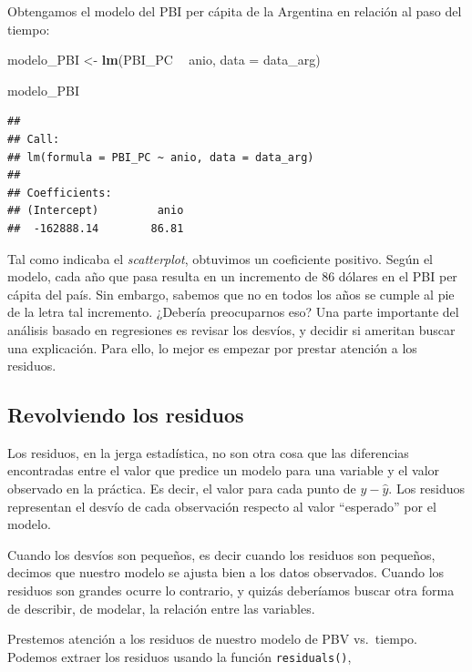 \documentclass[spanish,]{book}
\newenvironment{Shaded}{\begin{snugshade}}{\end{snugshade}}
\newcommand{\DataTypeTok}[1]{\textcolor[rgb]{0.13,0.29,0.53}{#1}}
\newcommand{\KeywordTok}[1]{\textcolor[rgb]{0.13,0.29,0.53}{\textbf{#1}}}
\newcommand{\NormalTok}[1]{#1}
\newcommand{\OperatorTok}[1]{\textcolor[rgb]{0.81,0.36,0.00}{\textbf{#1}}}
\newcommand{\StringTok}[1]{\textcolor[rgb]{0.31,0.60,0.02}{#1}}
\begin{document}
Obtengamos el modelo del PBI per cápita de la Argentina en relación al paso del tiempo:

\begin{Shaded}
\begin{Highlighting}[]
\NormalTok{modelo_PBI <-}\StringTok{ }\KeywordTok{lm}\NormalTok{(PBI_PC }\OperatorTok{~}\StringTok{ }\NormalTok{anio, }\DataTypeTok{data =}\NormalTok{ data_arg)}

\NormalTok{modelo_PBI}
\end{Highlighting}
\end{Shaded}

\begin{verbatim}
## 
## Call:
## lm(formula = PBI_PC ~ anio, data = data_arg)
## 
## Coefficients:
## (Intercept)         anio  
##  -162888.14        86.81
\end{verbatim}

Tal como indicaba el \emph{scatterplot}, obtuvimos un coeficiente positivo. Según el modelo, cada año que pasa resulta en un incremento de 86 dólares en el PBI per cápita del país. Sin embargo, sabemos que no en todos los años se cumple al pie de la letra tal incremento. ¿Debería preocuparnos eso? Una parte importante del análisis basado en regresiones es revisar los desvíos, y decidir si ameritan buscar una explicación. Para ello, lo mejor es empezar por prestar atención a los residuos.

\hypertarget{revolviendo-los-residuos}{%
\subsection{Revolviendo los residuos}\label{revolviendo-los-residuos}}

Los residuos, en la jerga estadística, no son otra cosa que las diferencias encontradas entre el valor que predice un modelo para una variable y el valor observado en la práctica. Es decir, el valor para cada punto de \(y - \widehat{y}\). Los residuos representan el desvío de cada observación respecto al valor ``esperado'' por el modelo.

Cuando los desvíos son pequeños, es decir cuando los residuos son pequeños, decimos que nuestro modelo se ajusta bien a los datos observados. Cuando los residuos son grandes ocurre lo contrario, y quizás deberíamos buscar otra forma de describir, de modelar, la relación entre las variables.

Prestemos atención a los residuos de nuestro modelo de PBV vs.~tiempo. Podemos extraer los residuos usando la función \texttt{residuals()},
\end{document}
